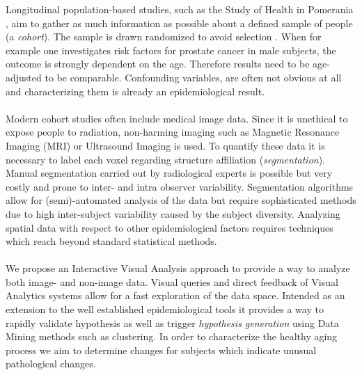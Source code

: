 \documentclass[journal]{style/vgtc} 			          %
\begin{document}
Longitudinal population-based studies, such as the Study of Health in Pomerania \cite{Volzke2011}, aim to gather as much information as possible about a defined sample of people (a \emph{cohort}).
%
The sample is drawn randomized to avoid selection \cite{Fletcher2012}. %
%
%
When for example one investigates risk factors for prostate cancer in male subjects, the outcome is strongly dependent on the age.
%
Therefore results need to be age-adjusted to be comparable.
%
Confounding variables, are often not obvious at all and characterizing them is already an epidemiological result.
\\\\
Modern cohort studies often include medical image data.
%
Since it is unethical to expose people to radiation, non-harming imaging such as Magnetic Resonance Imaging (MRI) or Ultrasound Imaging is used.
%
%
To quantify these data it is necessary to label each voxel regarding structure affiliation (\emph{segmentation}).
%
Manual segmentation carried out by radiological experts is possible but very costly and prone to inter- and intra observer variability.
%
Segmentation algorithms allow for (semi)-automated analysis of the data but require sophisticated methods due to high inter-subject variability caused by the subject diversity.
%
Analyzing spatial data with respect to other epidemiological factors requires techniques which reach beyond standard statistical methods.
\\\\
We propose an Interactive Visual Analysis approach \cite{Thomas2005} to provide a way to analyze both image- and non-image data.
%
Visual queries and direct feedback of Visual Analytics systems allow for a fast exploration of the data space.
%
Intended as an extension to the well established epidemiological tools it provides a way to rapidly validate hypothesis as well as trigger \emph{hypothesis generation} using Data Mining methods such as clustering.
%
In order to characterize the healthy aging process we aim to determine changes for subjects which indicate unusual pathological changes.
\\\\
\end{document}
